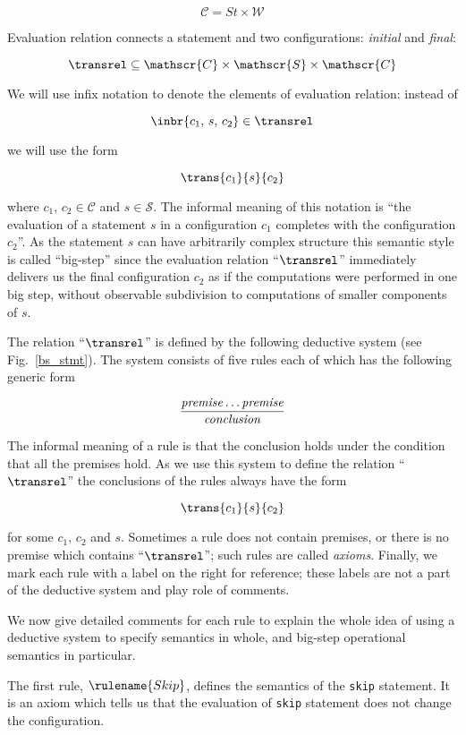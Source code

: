 \[
\mathscr{C} = St \times \mathscr W
\]

Evaluation relation connects a statement and two configurations: \emph{initial} and \emph{final}:

\[
\transrel\subseteq \mathscr{C}\times\mathscr{S}\times\mathscr{C}
\]

We will use infix notation to denote the elements of evaluation relation: instead of

\[
\inbr{c_1,\,s,\,c_2}\in\transrel
\]

we will use the form


\[
\trans{c_1}{s}{c_2}
\]


where $c_1,\,c_2\in\mathscr{C}$ and $s\in\mathscr{S}$. The informal meaning of this notation is
``the evaluation of a statement $s$ in a configuration $c_1$ completes with the configuration $c_2$''. As the
statement $s$ can have arbitrarily complex structure this semantic style is called ``big-step'' since
the evaluation relation ``$\transrel$'' immediately delivers us the final configuration $c_2$ as if
the computations were performed in one big step, without observable subdivision to computations
of smaller components of $s$.

The relation ``$\transrel$'' is defined by the following deductive system (see Fig.~\ref{bs_stmt}). The system
consists of five rules each of which has the following generic form

\[
\dfrac{\mbox{\emph{premise}}\dots\mbox{\emph{premise}}}{\mbox{\emph{conclusion}}}
\]

The informal meaning of a rule is that the conclusion holds under the condition that all the premises hold. As
we use this system to define the relation ``$\transrel$'' the conclusions of the rules always have
the form

\[
\trans{c_1}{s}{c_2}
\]

for some $c_1,\,c_2$ and $s$. Sometimes a rule does not contain premises, or there is no premise which
contains ``$\transrel$''; such rules are called \emph{axioms}. Finally, we mark each rule with
a label on the right for reference; these labels are not a part of the deductive system and play
role of comments.

We now give detailed comments for each rule to explain the whole idea of using a deductive system to
specify semantics in whole, and big-step operational semantics in particular.

The first rule, $\rulename{Skip}$, defines the semantics of the \lstinline|skip| statement. It is an
axiom which tells us that the evaluation of \lstinline|skip| statement does not change the configuration.

